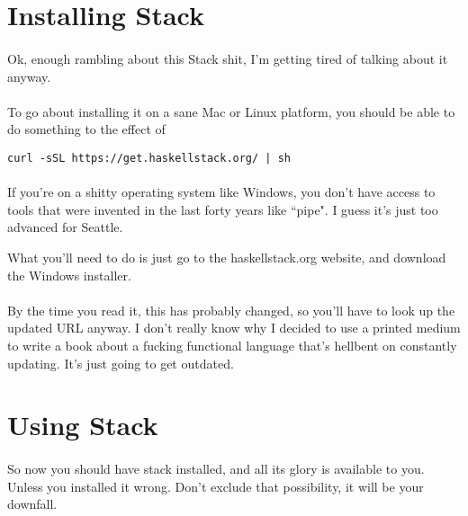 \section {Installing Stack}

\paragraph{}
Ok, enough rambling about this Stack shit, I'm getting tired of talking about it anyway.  

\paragraph{}
To go about installing it on a sane Mac or Linux platform, you should be able to do something to the effect of 

\begin{verbatim}
curl -sSL https://get.haskellstack.org/ | sh
\end{verbatim}

\paragraph{}
If you're on a shitty operating system like Windows, you don't have access to tools that were invented in the last forty years like ``pipe".  I guess it's just too advanced for Seattle. 

What you'll need to do is just go to the haskellstack.org website, and download the Windows installer. 

\paragraph{}
By the time you read it, this has probably changed, so you'll have to look up the updated URL anyway.  I don't really know why I decided to use a printed medium to write a book about a fucking functional language that's hellbent on constantly updating. It's just going to get outdated.

\section{Using Stack}
\paragraph{}
So now you should have stack installed, and all its glory is available to you.  Unless you installed it wrong.  Don't exclude that possibility, it will be your downfall.  


\paragraph{}


